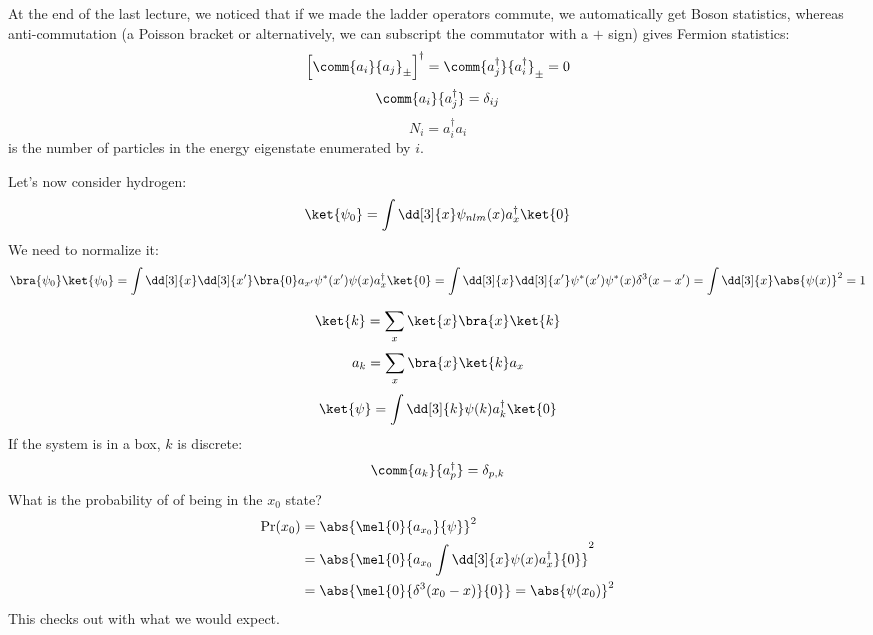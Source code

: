 \documentclass[a4paper,twoside,master.tex]{subfiles}
\begin{document}

At the end of the last lecture, we noticed that if we made the ladder operators commute, we automatically get Boson statistics, whereas anti-commutation (a Poisson bracket or alternatively, we can subscript the commutator with a $ + $ sign) gives Fermion statistics:
\begin{equation}
    \left[ \comm{a_i}{a_j}_{\pm} \right]^\dagger = \comm{a^\dagger_j}{a^\dagger_i}_{\pm} = 0
\end{equation}
\begin{equation}
    \comm{a_i}{a_j^\dagger} = \delta_{ij}
\end{equation}
\begin{equation}
    N_i = a_i^\dagger a_i
\end{equation}
is the number of particles in the energy eigenstate enumerated by $ i $.

Let's now consider hydrogen:
\begin{equation}
    \ket{\psi_0} = \int \dd[3]{x} \psi_{nlm}(x) a^\dagger_x\ket{0}
\end{equation}
We need to normalize it:
\begin{equation}
    \bra{\psi_0}\ket{\psi_0} = \int \dd[3]{x} \dd[3]{x'}\bra{0} a_{x'} \psi^*(x') \psi(x) a^\dagger_x\ket{0} = \int \dd[3]{x} \dd[3]{x'} \psi^*(x') \psi^*(x) \delta^3(x-x') = \int \dd[3]{x} \abs{\psi(x)}^2 = 1
\end{equation}

\begin{equation}
    \ket{k} = \sum_x\ket{x}\bra{x}\ket{k}
\end{equation}
\begin{equation}
    a_k = \sum_x\bra{x}\ket{k} a_x
\end{equation}
\begin{equation}
    \ket{\psi} = \int \dd[3]{k} \psi(k) a_k^\dagger\ket{0}
\end{equation}
If the system is in a box, $ k $ is discrete:
\begin{equation}
    \comm{a_k}{a^\dagger_p} = \delta_{p,k}
\end{equation}
What is the probability of of being in the $ x_0 $ state?
\begin{align}
    \Pr(x_0) &= \abs{\mel{0}{a_{x_0}}{\psi}}^2 \\
    &= \abs{\mel{0}{a_{x_0} \int \dd[3]{x} \psi(x) a_x^\dagger}{0}}^2 \\
    &= \abs{\mel{0}{\delta^3(x_0 - x)}{0}} = \abs{\psi(x_0)}^2
\end{align}
This checks out with what we would expect.
\end{document}
